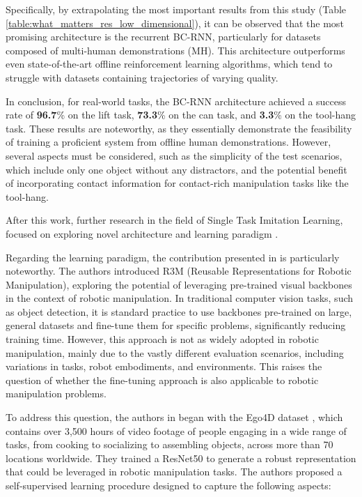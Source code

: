 Specifically, by extrapolating the most important results from this study (Table \ref{table:what_matters_res_low_dimensional}), it can be observed that the most promising architecture is the recurrent BC-RNN, particularly for datasets composed of multi-human demonstrations (MH). This architecture outperforms even state-of-the-art offline reinforcement learning algorithms, which tend to struggle with datasets containing trajectories of varying quality.

In conclusion, for real-world tasks, the BC-RNN architecture achieved a success rate of \textbf{96.7}\% on the lift task, \textbf{73.3}\% on the can task, and \textbf{3.3}\% on the tool-hang task. These results are noteworthy, as they essentially demonstrate the feasibility of training a proficient system from offline human demonstrations. However, several aspects must be considered, such as the simplicity of the test scenarios, which include only one object without any distractors, and the potential benefit of incorporating contact information for contact-rich manipulation tasks like the tool-hang.


After this work, further research in the field of Single Task Imitation Learning, focused on exploring novel architecture \cite{shafiullah2022behavior} and learning paradigm \cite{nair2022r3m,cheng2023diffusion,shi2023waypoint}. 

Regarding the learning paradigm, the contribution presented in \cite{nair2022r3m} is particularly noteworthy. The authors introduced R3M (Reusable Representations for Robotic Manipulation), exploring the potential of leveraging pre-trained visual backbones in the context of robotic manipulation. In traditional computer vision tasks, such as object detection, it is standard practice to use backbones pre-trained on large, general datasets and fine-tune them for specific problems, significantly reducing training time. However, this approach is not as widely adopted in robotic manipulation, mainly due to the vastly different evaluation scenarios, including variations in tasks, robot embodiments, and environments. This raises the question of whether the fine-tuning approach is also applicable to robotic manipulation problems.

To address this question, the authors in \cite{nair2022r3m} began with the Ego4D dataset \cite{grauman2022ego4d}, which contains over 3,500 hours of video footage of people engaging in a wide range of tasks, from cooking to socializing to assembling objects, across more than 70 locations worldwide. They trained a ResNet50 \cite{resnet} to generate a robust representation that could be leveraged in robotic manipulation tasks. The authors proposed a self-supervised learning procedure designed to capture the following aspects:


